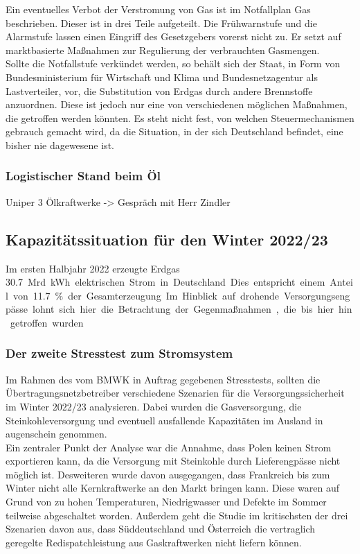 		Ein eventuelles Verbot der Verstromung von Gas ist im Notfallplan Gas beschrieben. Dieser ist in drei Teile aufgeteilt. Die Frühwarnstufe und die Alarmstufe lassen einen Eingriff des Gesetzgebers vorerst nicht zu. Er setzt auf marktbasierte Maßnahmen zur Regulierung der verbrauchten Gasmengen. \\
		
		Sollte die Notfallstufe verkündet werden, so behält sich der Staat, in Form von Bundesministerium für Wirtschaft und Klima und Bundesnetzagentur als Lastverteiler, vor, die Substitution von Erdgas durch andere Brennstoffe anzuordnen. Diese ist jedoch nur eine von verschiedenen möglichen Maßnahmen, die getroffen werden könnten. Es steht nicht fest, von welchen Steuermechanismen gebrauch gemacht wird, da die Situation, in der sich Deutschland befindet, eine bisher nie dagewesene ist. 
		
		\subsubsection{Logistischer Stand beim Öl}
		Uniper 3 Ölkraftwerke -> Gespräch mit Herr Zindler 
	
	
	\subsection{Kapazitätssituation für den Winter 2022/23}
	Im ersten Halbjahr 2022 erzeugte Erdgas \SI{30,7} Mrd. {kWh} elektrischen Strom in Deutschland. Dies entspricht einem Anteil von \SI{11,7}{\percent} der Gesamterzeugung. Im Hinblick auf drohende Versorgungsengpässe lohnt sich hier die Betrachtung der Gegenmaßnahmen, die bis hier hin getroffen wurden. \\
	
		\subsubsection{Der zweite Stresstest zum Stromsystem}
		Im Rahmen des vom BMWK in Auftrag gegebenen Stresstests, sollten die Übertragungsnetzbetreiber verschiedene Szenarien für die Versorgungssicherheit im Winter 2022/23 analysieren. Dabei wurden die Gasversorgung, die Steinkohleversorgung und eventuell ausfallende Kapazitäten im Ausland in augenschein genommen.\\
		
		Ein zentraler Punkt der Analyse war die Annahme, dass Polen keinen Strom exportieren kann, da die Versorgung mit Steinkohle durch Lieferengpässe nicht möglich ist. Desweiteren wurde davon ausgegangen, dass Frankreich bis zum Winter nicht alle Kernkraftwerke an den Markt bringen kann. Diese waren auf Grund von zu hohen Temperaturen, Niedrigwasser und Defekte im Sommer teilweise abgeschaltet worden. Außerdem geht die Studie im kritischsten der drei Szenarien davon aus, dass Süddeutschland und Österreich die vertraglich geregelte Redispatchleistung aus Gaskraftwerken nicht liefern können. \\
		
